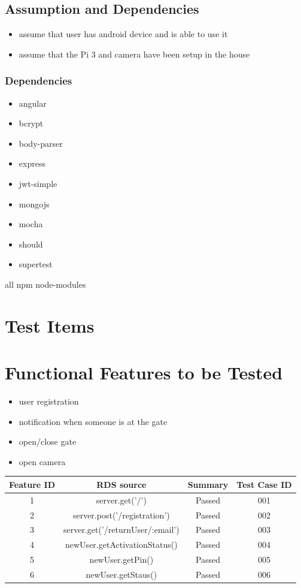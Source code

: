 \documentclass[a4paper,12pt]{article}
\begin{document}
	\subsection{Assumption and Dependencies}
		\begin{itemize}
			\item assume that user has android device and is able to use it
			\item assume that the Pi 3 and camera have been setup in the house
		\end{itemize}
		
		\subsubsection{Dependencies}
			\begin{itemize}
					\item angular
					\item bcrypt
					\item body-parser
					\item express
					\item jwt-simple
					\item mongojs
					\item mocha
					\item should
					\item supertest
			\end{itemize}
			
			all npm node-modules
\section{Test Items}
	\section{Functional Features to be Tested}
		\begin{itemize}
				\item user registration
				\item notification when someone is at the gate
				\item open/close gate
				\item open camera
		\end{itemize}
		
		
		\begin{tabular}{c c c c}
			Feature ID & RDS source & Summary & Test Case ID\\ [0.5ex]
			\hline
			
			1 & server.get('/')& Passed & 001 \\
			2 & server.post('/registration') & Passed & 002 \\
			3 & server.get('/returnUser/:email') & Passed & 003 \\
			4 & newUser.getActivationStatus() & Passed & 004 \\
			5 & newUser.getPin() & Passed & 005 \\
			6 & newUser.getStaus() & Passed & 006 \\
		\end{tabular}
\end{document}
